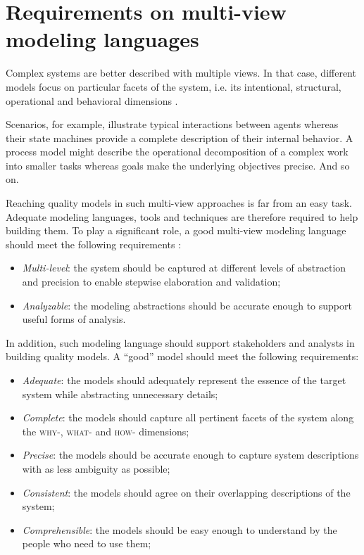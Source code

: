 \section{Requirements on multi-view modeling languages\label{section:intro-requirements}}

Complex systems are better described with multiple views. In that case, different models focus on particular facets of the system, i.e. its intentional, structural, operational and behavioral dimensions \cite{VanLamsweerde:2009}. 

Scenarios, for example, illustrate typical interactions between agents whereas their state machines provide a complete description of their internal behavior. A process model might describe the operational decomposition of a complex work into smaller tasks whereas goals make the underlying objectives precise. And so on.

Reaching quality models in such multi-view approaches is far from an easy task. Adequate modeling languages, tools and techniques are therefore required to help building them. To play a significant role, a good multi-view modeling language should meet the following requirements \cite{VanLamsweerde:2009}:

\begin{itemize}
\item \emph{Multi-level}: the system should be captured at different levels of abstraction and precision to enable stepwise elaboration and validation;
\item \emph{Analyzable}: the modeling abstractions should be accurate enough to support useful forms of analysis.
\end{itemize}

In addition, such modeling language should support stakeholders and analysts in building quality models. A ``good'' model should meet the following requirements:

\begin{itemize}
\item \emph{Adequate}: the models should adequately represent the essence of the target system while abstracting unnecessary details;
\item \emph{Complete}: the models should capture all pertinent facets of the system along the \textsc{why-}, \textsc{what-} and \textsc{how-} dimensions;
\item \emph{Precise}: the models should be accurate enough to capture system descriptions with as less ambiguity as possible;
\item \emph{Consistent}: the models should agree on their overlapping descriptions of the system;
\item \emph{Comprehensible}: the models should be easy enough to understand by the people who need to use them;
\end{itemize}

